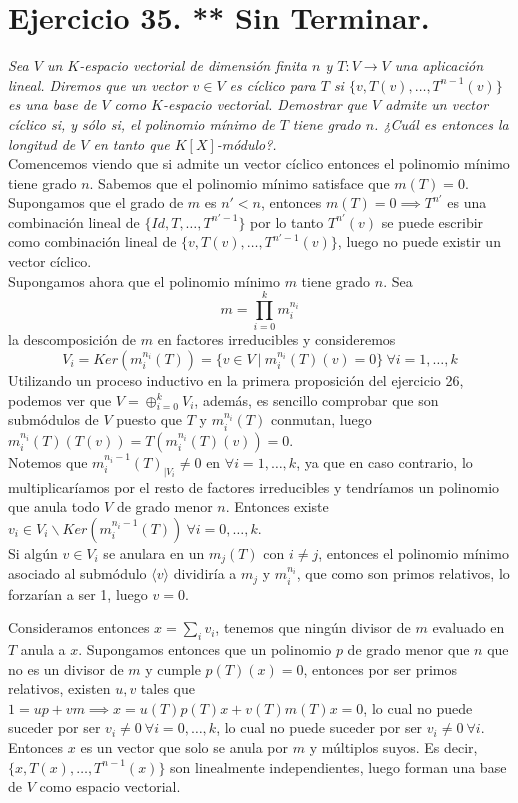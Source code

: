 \section{Ejercicio 35. ** Sin Terminar.} \textit{Sea \(V\) un \(K\)-espacio
  vectorial de dimensión finita \(n\) y \(T:V \to V\) una
  aplicación lineal. Diremos que un vector \(v \in V\) es cíclico para
  \(T\) si \(\{v, T(v), \dots, T^{n-1}(v)\}\) es una base de \(V\)
  como \(K\)-espacio vectorial. Demostrar que \(V\) admite un vector cíclico si,
  y sólo si, el polinomio mínimo de \(T\) tiene grado \(n\). ¿Cuál es entonces
  la longitud de \(V\) en tanto que \(K[X]\)-módulo?.}\\


Comencemos viendo que si admite un vector cíclico entonces el polinomio mínimo
tiene grado \(n\). Sabemos que el polinomio mínimo satisface que \(m(T)=0\). Supongamos que el
grado de \(m\) es \(n' < n\),  entonces \(m(T)=0 \implies T^{n'}\) es una
combinación lineal de \(\{Id,T,\dots,T^{n'-1}\}\) por lo tanto \(T^{n'}(v)\) se
puede escribir como combinación lineal de \(\{v,T(v),\dots,T^{n'-1}(v)\}\),
luego no puede existir un vector cíclico.\\

Supongamos ahora que el polinomio mínimo \(m\) tiene grado \(n\). Sea
\[
  m = \prod_{i=0}^k m_i^{n_i}
\]
la descomposición de \(m\) en factores irreducibles y consideremos
\[
  V_i = Ker(m_i^{n_i}(T)) = \{v \in V \ | \ m_i^{n_i}(T)(v) = 0\} \ \forall i = 1,\dots,k
\]
Utilizando un proceso inductivo en la primera proposición del ejercicio 26, podemos ver
que \(V = \oplus_{i=0}^k V_i\), además, es sencillo comprobar que son submódulos de \(V\) puesto que \(T\) y \(m_i^{n_i}(T)\)
conmutan, luego \(m_i^{n_i}(T)(T(v)) = T(m_i^{n_i}(T)(v)) = 0\).\\

Notemos que \(m_i^{n_i - 1}(T)_{|V_i} \neq 0\) en \(\forall i=1,\dots,k\), ya que en caso
contrario, lo multiplicaríamos por el resto de factores irreducibles y
tendríamos un polinomio que anula todo \(V\) de grado menor \(n\). Entonces existe \(v_i \in V_i\backslash Ker(m_i^{n_i-1}(T)) \ \forall i=0,\dots,k\).\\

Si algún \(v \in V_i\) se anulara en un \(m_j(T)\) con \(i \neq j\),
entonces el polinomio mínimo asociado al submódulo \(\langle v \rangle\) dividiría a \(m_j\) y
\(m_i^{n_i}\), que como son primos relativos, lo forzarían a ser 1, luego \(v = 0\).

Consideramos entonces \(x = \sum_i v_i\), tenemos que ningún divisor de \(m\)
evaluado en \(T\) anula a \(x\). Supongamos entonces que un polinomio \(p\) de
grado menor que \(n\) que no es un divisor de \(m\) y cumple \(p(T)(x) = 0\),
entonces por ser primos relativos, existen \(u,v\) tales que \(1 = up + vm
\implies x = u(T)p(T)x + v(T)m(T)x = 0 \), lo cual no puede suceder por ser
\(v_i \neq 0 \ \forall i=0,\dots,k\), lo cual no puede suceder por ser \(v_i \neq 0 \
\forall i\). \\

Entonces \(x\) es un vector que solo se anula
por \(m\) y múltiplos suyos. Es decir, \(\{x, T(x), \dots, T^{n-1}(x)\}\)
son linealmente independientes, luego forman una base de \(V\) como espacio
vectorial.\\
